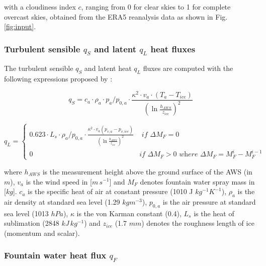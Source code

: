 \documentclass[utf8]{frontiersSCNS} %
\begin{document}
with a cloudiness index $c$, ranging from 0 for clear skies to 1 for complete overcast skies, obtained from the ERA5
reanalysis data as shown in Fig.  \ref{fig:input}.

\subsubsection{Turbulent sensible $q_{S}$ and latent $q_{L}$ heat fluxes }

The turbulent sensible $q_{S}$ and latent heat $q_{L}$ fluxes are computed with the following expressions proposed by
\cite{Garratt_1992}:

\begin{equation} q_{S}=c_{a} \cdot \rho_{a} \cdot p_{a}/p_{0,a} \cdot \frac{\kappa^2 \cdot v_a \cdot
(T_a-T_{ice})}{{(\ln{\frac{h_{AWS}}{z_{ice}}})}^2} \label{eqn:qs} \end{equation}

\begin{equation} q_{L} = \left\{ \begin{array}{ll}
        
         0.623 \cdot L_s \cdot \rho_{a}/p_{0,a} \cdot \frac{\kappa^2 \cdot
         v_a(p_{v,a}-p_{v,ice})}{{(\ln{\frac{h_{AWS}}{z_{ice}}})}^2} & \textit{ if } \Delta M_{F} = 0\\ 0 & \textit{
       if } \Delta M_{F} > 0 \textit{ where } \Delta M_{F} = M_{F}^{i} - M_{F}^{i-1}
         
    \end{array} \right.  \label{eqn:ql} \end{equation}

where $h_{AWS}$ is the measurement height above the ground surface of the AWS (in $m$), $v_a$ is the wind speed in
[$m\,s^{-1}$] and $M_{F}$ denotes fountain water spray mass in [$kg$]. $c_a$ is the specific heat of air at constant
pressure (1010 J $kg^{-1} K^{-1}$), $\rho_{a}$ is the air density at standard sea level (1.29 $kg m^{-3}$), $p_{0,a}$
is the air pressure at standard sea level (1013 $hPa$), $\kappa$ is the von Karman constant (0.4), $L_s$ is the heat
of sublimation (2848 $kJ\, kg^{-1}$) and $z_{ice}$ (1.7 $mm$) denotes the roughness length of ice (momentum and
scalar).

\subsubsection{Fountain water heat flux $q_{F}$ }
\end{document}
